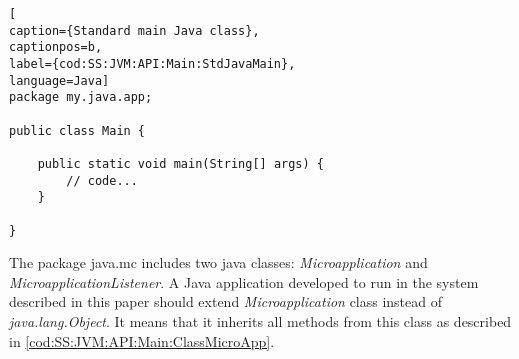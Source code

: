 \medskip
\begin{lstlisting}[
caption={Standard main Java class},
captionpos=b,
label={cod:SS:JVM:API:Main:StdJavaMain},
language=Java]
package my.java.app;

public class Main {

    public static void main(String[] args) {
        // code...
    }

}
\end{lstlisting}
\medskip

The package java.mc includes two java classes: \textit{Microapplication} and \textit{MicroapplicationListener}. A Java application developed to run in the system described in this paper should extend \textit{Microapplication} class instead of \textit{java.lang.Object}. It means that it inherits all methods from this class as described in \ref{cod:SS:JVM:API:Main:ClassMicroApp}.

